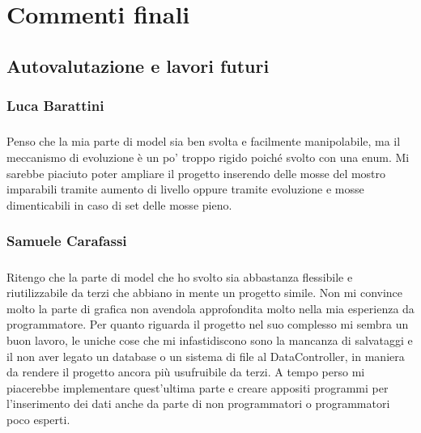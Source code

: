 \chapter{Commenti finali}

\section{Autovalutazione e lavori futuri}


\subsection*{Luca Barattini}
\paragraph{}
Penso che la mia parte di model sia ben svolta e facilmente manipolabile, ma il meccanismo di evoluzione è un po' troppo rigido poiché svolto con una enum.
\newline
Mi sarebbe piaciuto poter ampliare il progetto inserendo delle mosse del mostro imparabili tramite aumento di livello oppure tramite evoluzione e mosse dimenticabili in caso di set delle mosse pieno.


\subsection*{Samuele Carafassi}
\paragraph{}
Ritengo che la parte di model che ho svolto sia abbastanza flessibile e riutilizzabile da terzi che abbiano in mente un progetto simile.
\newline
Non mi convince molto la parte di grafica non avendola approfondita molto nella mia esperienza da programmatore.
\newline
Per quanto riguarda il progetto nel suo complesso mi sembra un buon lavoro, le uniche cose che mi infastidiscono sono la mancanza di salvataggi e il non aver legato un database o un sistema di file al DataController, in maniera da rendere il progetto ancora più usufruibile da terzi. A tempo perso mi piacerebbe implementare quest'ultima parte e creare appositi programmi per l'inserimento dei dati anche da parte di non programmatori o programmatori poco esperti.

